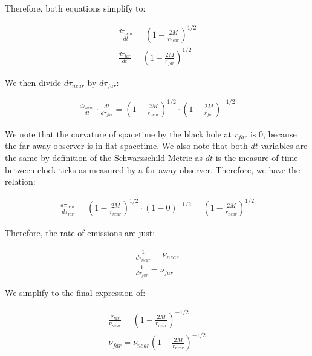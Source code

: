 \documentclass[]{report}
\begin{document}
        Therefore, both equations simplify to:

        \begin{equation*}
          \begin{split}
          \frac{d\tau_{near}}{dt} = \left(1 - \frac{2M}{r_{near}}\right)^{1/2} \\
          \frac{d\tau_{far}}{dt} = \left(1 - \frac{2M}{r_{far}}\right)^{1/2}
          \end{split}
        \end{equation*}


        We then divide $d\tau_{near}$ by $d\tau_{far}$:

        \begin{equation*}
          \begin{split}
          \frac{d\tau_{near}}{dt}\cdot\frac{dt}{d\tau_{far}} = \left(1 -  \frac{2M}{r_{near}}\right)^{1/2}\cdot\left(1 - \frac{2M}{r_{far}}\right)^{-1/2}
          \end{split}
        \end{equation*}


        We note that the curvature of spacetime by the black hole at $r_{far}$ is 0, because the far-away observer is in flat spacetime. We also note that both $dt$ variables are the same by definition of the Schwarzschild Metric as $dt$ is the measure of time between clock ticks as measured by a far-away observer. Therefore, we have the relation:

        \begin{equation*}
          \begin{split}
          \frac{d\tau_{near}}{d\tau_{far}} =  \left(1 - \frac{2M}{r_{near}}\right)^{1/2}\cdot \left(1 - 0\right)^{-1/2} = \left(1 - \frac{2M}{r_{near}}\right)^{1/2}
          \end{split}
        \end{equation*}


        Therefore, the rate of emissions are just:

        \begin{equation*}
          \begin{split}
          \frac{1}{d\tau_{near}}=\nu_{near}\\
          \frac{1}{d\tau_{far}}=\nu_{far}
          \end{split}
        \end{equation*}


        We simplify to the final expression of:

        \begin{equation*}
          \begin{split}
          \frac{\nu_{far}}{\nu_{near}} = \left(1 - \frac{2M}{r_{near}} \right)^{-1/2}\\
          \nu_{far} = \nu_{near}\left(1 - \frac{2M}{r_{near}} \right)^{-1/2}
          \end{split}
        \end{equation*}
\end{document}
